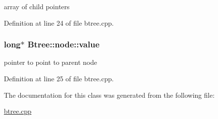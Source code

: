 array of child pointers 



Definition at line 24 of file btree.\-cpp.

\hypertarget{class_btree_1_1node_ac38e10b3743673fa9f8ff9b6551d64ba}{
\subsubsection[{value}]{\setlength{\rightskip}{0pt plus 5cm}long$\ast$ Btree\-::node\-::value}}\label{class_btree_1_1node_ac38e10b3743673fa9f8ff9b6551d64ba}


pointer to point to parent node 



Definition at line 25 of file btree.\-cpp.



The documentation for this class was generated from the following file\-:\begin{DoxyCompactItemize}
\item 
\hyperlink{btree_8cpp}{btree.\-cpp}\end{DoxyCompactItemize}
